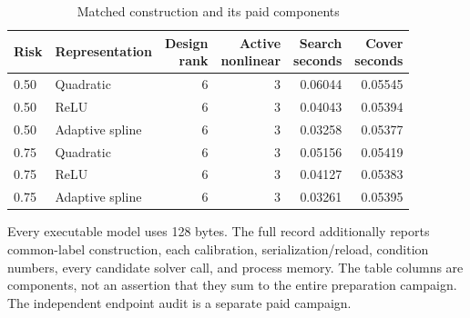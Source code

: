 \begin{table}[htbp]
\caption{Matched construction and its paid components}\label{tab:prepare96}
\centering\small\begin{tabular}{l l r r r r}\toprule
Risk & Representation & \shortstack{Design\\rank} & \shortstack{Active\\nonlinear} & \shortstack{Search\\seconds} & \shortstack{Cover\\seconds}\\
\midrule
0.50 & Quadratic & 6 & 3 & 0.06044 & 0.05545 \\
0.50 & ReLU & 6 & 3 & 0.04043 & 0.05394 \\
0.50 & Adaptive spline & 6 & 3 & 0.03258 & 0.05377 \\
0.75 & Quadratic & 6 & 3 & 0.05156 & 0.05419 \\
0.75 & ReLU & 6 & 3 & 0.04127 & 0.05383 \\
0.75 & Adaptive spline & 6 & 3 & 0.03261 & 0.05395 \\
\bottomrule\end{tabular}
\par\smallskip\parbox{.97\linewidth}{\footnotesize Every executable model uses 128 bytes. The full record additionally reports common-label construction, each calibration, serialization/reload, condition numbers, every candidate solver call, and process memory. The table columns are components, not an assertion that they sum to the entire preparation campaign. The independent endpoint audit is a separate paid campaign.}
\end{table}
